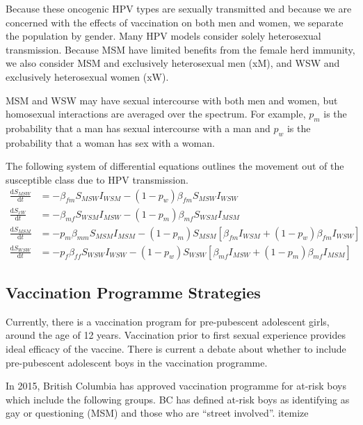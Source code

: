 \documentclass[12pt]{article}
\newcommand{\D}[2]{\frac{\mathrm{d}#1}{\mathrm{d}#2}}
\begin{document}
Because these oncogenic HPV types are sexually transmitted and because we are concerned with the effects of vaccination on both men and women, we separate the population by gender.  Many HPV models consider solely heterosexual transmission.  Because MSM have limited benefits from the female herd immunity, we also consider MSM and exclusively heterosexual men (xM), and WSW and exclusively heterosexual women (xW).  

MSM and WSW may have sexual intercourse with both men and women, but homosexual interactions are averaged over the spectrum.  For example, $p_m$ is the probability that a man has sexual intercourse with a man and $p_w$ is the probability that a woman has sex with a woman.  

The following system of differential equations outlines the movement out of the susceptible class due to HPV transmission. 
\begin{align}
\D{S_{MSW}}{t} & = - \beta_{fm}S_{MSW}I_{WSM} - (1-p_w)\beta_{fm}S_{MSW}I_{WSW}\\
\D{S_{xW}}{t} & = - \beta_{mf}S_{WSM}I_{MSW} - (1-p_m)\beta_{mf}S_{WSM}I_{MSM}\\
\D{S_{MSM}}{t} & = -p_m\beta_{mm}S_{MSM}I_{MSM} - (1-p_m)S_{MSM}[\beta_{fm}I_{WSM} + (1-p_w)\beta_{fm}I_{WSW}]\\
\D{S_{WSW}}{t} & = -p_f\beta_{ff}S_{WSW}I_{WSW} - (1-p_w)S_{WSW}[\beta_{mf}I_{MSW} + (1-p_m)\beta_{mf}I_{MSM}]
\end{align}
 

\subsection{Vaccination Programme Strategies}

Currently, there is a vaccination program for pre-pubescent adolescent girls, around the age of 12 years.  Vaccination prior to first sexual experience provides ideal efficacy of the vaccine. There is current a debate about whether to include pre-pubescent adolescent boys in the vaccination programme. 

In 2015, British Columbia has approved vaccination programme for at-risk boys which include the following groups.  BC has defined at-risk boys as identifying as gay or questioning (MSM) and those who are ``street involved''.
{itemize}



\newpage


\end{document}
